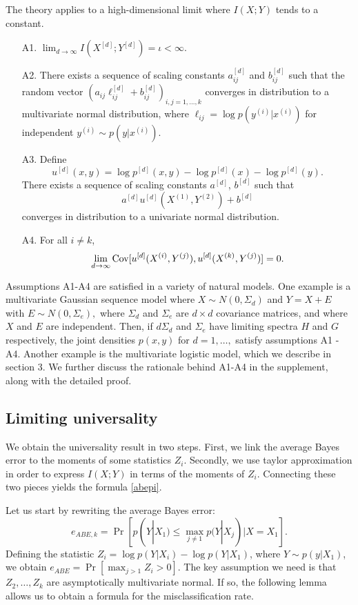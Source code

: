 The theory applies to a high-dimensional limit where $I(X; Y)$ tends to a constant.

\begin{itemize}
\item[A1.] $\lim_{d \to \infty} I(X^{[d]}; Y^{[d]}) = \iota < \infty.$
\item[A2.] There exists a sequence of scaling constants $a_{ij}^{[d]}$
and $b_{ij}^{[d]}$ such that the random vector $(a_{ij}\ell_{ij}^{[d]} +
b_{ij}^{[d]})_{i, j = 1,\hdots, k}$ converges in distribution to a
multivariate normal distribution,
where $\ell_{ij} = \log p(y^{(i)}|x^{(i)})$ for independent $y^{(i)} \sim p(y|x^{(i)})$.
\item[A3.] Define \[
u^{[d]}(x, y) = \log p^{[d]}(x, y) - \log p^{[d]}(x) - \log p^{[d]}(y).
\]
There exists a sequence of scaling constants $a^{[d]}$, $b^{[d]}$ such that
\[
a^{[d]}u^{[d]}(X^{(1)}, Y^{(2)}) + b^{[d]}
\]
converges in distribution to a univariate normal distribution.
\item[A4.] For all $i \neq k$,
\[\lim_{d \to \infty}\text{Cov}[u^{[d]}(X^{(i)}, Y^{(j)}), u^{[d]}(X^{(k)}, Y^{(j)})] = 0.\]
\end{itemize}

Assumptions A1-A4 are satisfied in a variety of natural models.  One
example is a multivariate Gaussian sequence model where $X \sim N(0,
\Sigma_d)$ and $ Y = X + E $ with $ E \sim N(0, \Sigma_e), $ where
$\Sigma_d$ and $\Sigma_e$ are $d \times d$ covariance matrices, and
where $X$ and $E$ are independent.  Then, if $d \Sigma_d$ and
$\Sigma_e$ have limiting spectra $H$ and $G$ respectively, the joint
densities $p(x, y)$ for $d = 1,\hdots, $ satisfy assumptions A1 - A4.
Another example is the multivariate logistic model, which we describe
in section 3.  We further discuss the rationale behind A1-A4 in the
supplement, along with the detailed proof.

\subsection{Limiting universality}

We obtain the universality result in two steps.  First, we link the
average Bayes error to the moments of some statistics $Z_i$.
Secondly, we use taylor approximation in order to express $I(X; Y)$ in
terms of the moments of $Z_i$.  Connecting these two pieces yields the
formula \eqref{abepi}.

Let us start by rewriting the average Bayes error:
\[
e_{ABE, k} = \Pr[p(Y|X_1) \leq \max_{j \neq 1} p(Y|X_j)| X = X_1].
\]
Defining the statistic $Z_i = \log p(Y|X_i) - \log p(Y|X_1)$, where $Y
\sim p(y|X_1)$, we obtain $ e_{ABE} = \Pr[\max_{j > 1} Z_i > 0].  $
The key assumption we need is that $Z_2,\hdots, Z_k$ are
asymptotically multivariate normal.  If so, the following lemma allows
us to obtain a formula for the misclassification rate.

